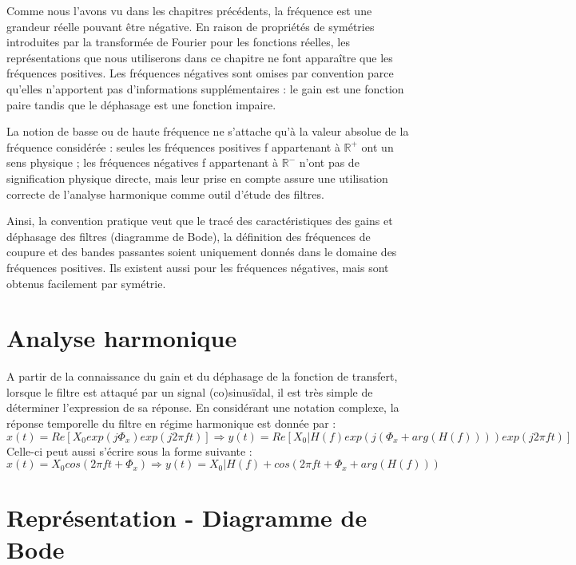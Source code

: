 	Comme nous l'avons vu dans les chapitres précédents, la fréquence est une grandeur réelle pouvant être négative. En raison de propriétés de symétries introduites par la transformée de Fourier pour les fonctions réelles, les représentations que nous utiliserons dans ce chapitre ne font apparaître que les fréquences positives. Les fréquences négatives sont omises par convention parce qu'elles n'apportent pas d'informations supplémentaires : le gain est une fonction paire tandis que le déphasage est une fonction impaire.
	
	La notion de basse ou de haute fréquence ne s’attache qu’à la valeur absolue de la fréquence considérée : seules les fréquences positives f appartenant à $\mathbb{R}^{+}$ ont un sens physique ; les fréquences négatives f appartenant à $\mathbb{R}^{-}$ n’ont pas de signification physique directe, mais leur prise en compte assure une utilisation correcte de l’analyse harmonique comme outil d’étude des filtres.
	
	Ainsi, la convention pratique veut que le tracé des caractéristiques des gains et déphasage des filtres (diagramme de Bode), la définition des fréquences de coupure et des bandes passantes soient uniquement donnés dans le domaine des fréquences positives. Ils existent aussi pour les fréquences négatives, mais sont obtenus facilement par symétrie.
	
	\vspace{1\baselineskip}
	
	\section{Analyse harmonique}
	A partir de la connaissance du gain et du déphasage de la fonction de transfert, lorsque le filtre est attaqué par un signal (co)sinusïdal, il est très simple de déterminer l'expression de sa réponse. En considérant une notation complexe, la réponse temporelle du filtre en régime harmonique est donnée par :
	\begin{equation}\label{}
	x(t) = Re[X_{0}exp(j\Phi_{x})exp(j2\pi ft)] \Rightarrow y(t) = Re[X_{0}|H(f)exp(j(\Phi_{x}+arg(H(f))))exp(j2\pi ft)]
	\end{equation}
	Celle-ci peut aussi s'écrire sous la forme suivante :
	\begin{equation}\label{key}
	x(t) = X_{0}cos(2\pi ft+\Phi_{x}) \Rightarrow y(t) = X_{0}|H(f)+cos(2\pi ft+\Phi_{x}+arg(H(f)))
	\end{equation}
	
	\section{Représentation - Diagramme de Bode}
